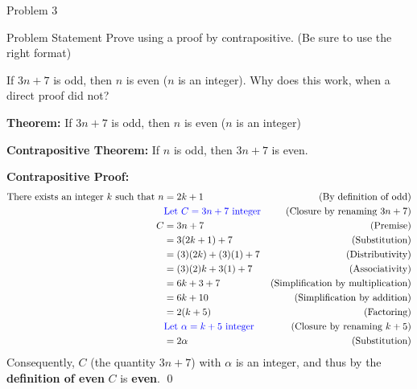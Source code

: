 \begin{problem}{Problem 3}
    \begin{statement}{Problem Statement}
        Prove using a proof by contrapositive. (Be sure to use the right format) \vspace*{1em}

        If $3n + 7$ is odd, then $n$ is even ($n$ is an integer). Why does this work, when a direct proof did not?
    \end{statement}

    \begin{Highlight}[Solution]
        \textbf{Theorem:} If $3n + 7$ is odd, then $n$ is even ($n$ is an integer) \vspace*{1em}

        \textbf{Contrapositive Theorem:} If $n$ is odd, then $3n + 7$ is even. \vspace*{1em}

        \textbf{Contrapositive Proof:} \newline
        \begin{align*}
            \text{There exists an integer $k$ such that } n & = 2k + 1 & \text{(By definition of odd)} \\
            & \textcolor{blue}{\text{Let } C = 3n + 7 \text{ integer}} & \text{(Closure by renaming $3n + 7$)} \\
            C & = 3n + 7 & \text{(Premise)} \\
            & = 3(2k + 1) + 7 & \text{(Substitution)} \\
            & = (3)(2k) + (3)(1) + 7 & \text{(Distributivity)} \\
            & = (3)(2)k + 3(1) + 7 & \text{(Associativity)} \\
            & = 6k + 3 + 7 & \text{(Simplification by multiplication)} \\
            & = 6k + 10 & \text{(Simplification by addition)} \\
            & = 2(k + 5) & \text{(Factoring)} \\
            & \textcolor{blue}{\text{Let } \alpha = k + 5 \text{ integer}} & \text{(Closure by renaming $k + 5$)} \\
            & = 2\alpha & \text{(Substitution)} \\
        \end{align*}
        Consequently, $C$ (the quantity $3n + 7$) with $\alpha$ is an integer, and thus by the \textbf{definition of even} $C$ is \textbf{even}. \qed
    \end{Highlight}


\end{problem}
